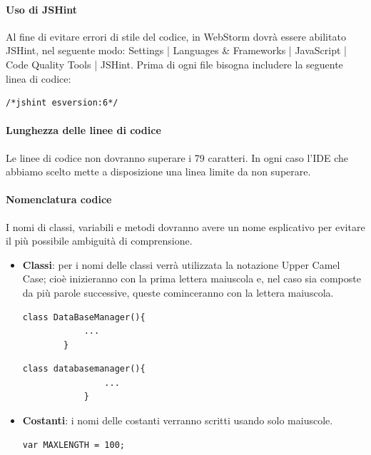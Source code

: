 \documentclass[11pt,a4paper]{article}
\begin{document}
{	\paragraph{Uso di JSHint}
	Al fine di evitare errori di stile del codice, in WebStorm dovrà essere abilitato JSHint, nel seguente modo: Settings | Languages \& Frameworks | JavaScript | Code Quality Tools | JSHint.
	Prima di ogni file bisogna includere la seguente linea di codice:
	\begin{lstlisting}[caption=inclusione JSHint]
/*jshint esversion:6*/
	\end{lstlisting}
	
	\paragraph{Lunghezza delle linee di codice} Le linee di codice non dovranno superare i 79 caratteri. In ogni caso l'IDE che abbiamo scelto mette a disposizione una linea limite da non superare.
	
	\paragraph{Nomenclatura codice}
	I nomi di classi, variabili e metodi dovranno avere un nome esplicativo per evitare il più possibile ambiguità di comprensione.
	\begin{itemize}
		\item \textbf{Classi}: per i nomi delle classi verrà utilizzata la notazione Upper Camel Case; cioè inizieranno con la prima lettera maiuscola e, nel caso sia composte da più parole successive, queste cominceranno con la lettera maiuscola.
	
		\begin{multicols}{2}
			
			\begin{lstlisting}[caption=nome classe corretto]
		class DataBaseManager(){
			...
		}
			\end{lstlisting}
			
			\begin{lstlisting}[caption=nome classe scorretto]
			class databasemanager(){
				...
			}
			\end{lstlisting}
		\end{multicols}
		
		\item \textbf{Costanti}: i nomi delle costanti verranno scritti usando solo maiuscole.
		
		\begin{multicols}{2}	
			\begin{lstlisting}[caption=nome costante corretto]
			var MAXLENGTH = 100;
			\end{lstlisting}
			

\end{multicols}
\end{itemize}}
\end{document}
